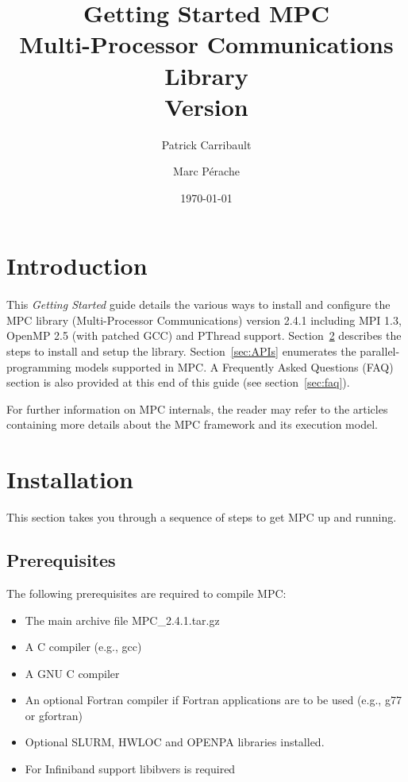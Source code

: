 \documentclass[a4paper,11pt]{article}
\title{Getting Started MPC\\Multi-Processor Communications Library\\Version {\MPCVERSION}}
\author{Patrick Carribault \and Marc P\'{e}rache}
\date{\today}
\def\MPCVERSION{2.4.1}
\begin{document}
\maketitle
\tableofcontents

\section{Introduction}

\paragraph{}
This \textit{Getting Started} guide details the various ways to install and configure the MPC library
(Multi-Processor Communications) version {\MPCVERSION} including MPI 1.3, OpenMP 2.5 (with patched GCC) and PThread support.
Section~\ref{sec:installation} describes the steps to install and setup the library.
Section~\ref{sec:APIs} enumerates the parallel-programming models supported in MPC.
A Frequently Asked Questions (FAQ) section is also provided at this end of this guide (see section~\ref{sec:faq}).

For further information on MPC internals, the reader may refer to the
articles~\cite{Perache08,Perache09,Carribault10} containing more details about the MPC
framework and its execution model.

\section{Installation}
\label{sec:installation}

This section takes you through a sequence of steps to get MPC up and running.

\subsection{Prerequisites}

The following prerequisites are required to compile MPC:
\begin{itemize}
    \item  The main archive file MPC\_{\MPCVERSION}.tar.gz

    \item  A C compiler (e.g., gcc)

    \item  A GNU C compiler

    \item  An optional Fortran compiler if Fortran applications are to be used
      (e.g., g77 or gfortran)

    \item  Optional SLURM, HWLOC and OPENPA libraries installed.

    \item  For Infiniband support libibvers is required
\end{itemize}
\end{document}
